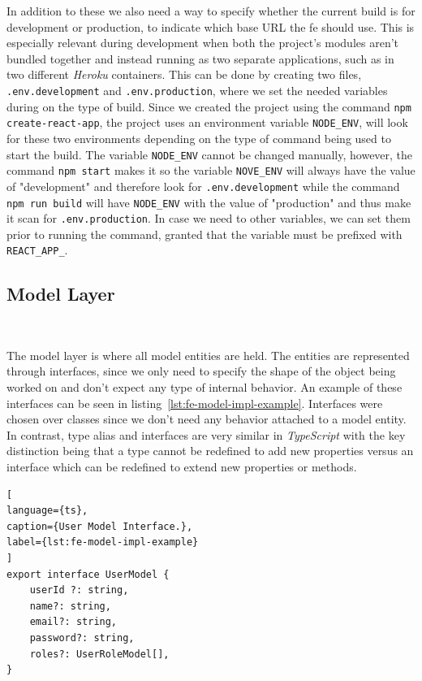 In addition to these we also need a way to specify whether the current build is for development or production, to indicate which base URL the \acrshort{fe} should use. This is especially relevant during development when both the project's modules aren't bundled together and instead running as two separate applications, such as in two different \textit{Heroku} containers.
This can be done by creating two files, \lstinline{.env.development} and \lstinline{.env.production}, where we set the needed variables during on the type of build. Since we created the project using the command \lstinline[keywordstyle=\color{black},commentstyle=\color{black},stringstyle=\color{black}]{npm create-react-app}, the project uses an environment variable \lstinline{NODE_ENV}, will look for these two environments depending on the type of command being used to start the build. The variable \lstinline{NODE_ENV} cannot be changed manually, however, the command \lstinline{npm start} makes it so the variable \lstinline{NOVE_ENV} will always have the value of "development" and therefore look for \lstinline{.env.development} while the command \lstinline{npm run build} will have \lstinline{NODE_ENV} with the value of "production" and thus make it scan for \lstinline{.env.production}.  In case we need to other variables, we can set them prior to running the command, granted that the variable must be prefixed with \lstinline{REACT_APP_}.


\subsection{Model Layer}~\label{ch:impl:sec:fe:subsec:model-layer}

The model layer is where all model entities are held. 
The entities are represented through interfaces, since we only need to specify the shape of the object being worked on and don't expect any type of internal behavior. An example of these interfaces can be seen in listing~\ref{lst:fe-model-impl-example}.
Interfaces were chosen over classes since we don't need any behavior attached to a model entity. In contrast, type alias and interfaces are very similar in \textit{TypeScript} with the key distinction being that a type cannot be redefined to add new properties versus an interface which can be redefined to extend new properties or methods.

\begin{lstlisting}[
language={ts},
caption={User Model Interface.},
label={lst:fe-model-impl-example}
]
export interface UserModel {
    userId ?: string,
    name?: string,
    email?: string,
    password?: string,
    roles?: UserRoleModel[],
}
\end{lstlisting}

